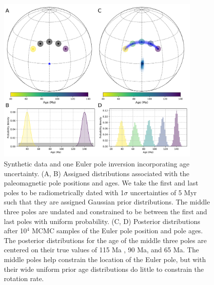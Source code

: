 \documentclass[11pt,letterpaper]{article}
\begin{document}
\begin{figure}
\centering
\includegraphics[width=0.9\textwidth]{fig_inversion_with_age_uncertainties.png}
\caption{Synthetic data and one Euler pole inversion incorporating age uncertainty. (A, B) Assigned distributions associated with the paleomagnetic pole positions and ages. We take the first and last poles to be radiometrically dated with 1$\sigma$ uncertainties of 5 Myr such that they are assigned Gaussian prior distributions. The middle three poles are undated and constrained to be between the first and last poles with uniform probability. (C, D) Posterior distributions after 10$^4$ MCMC samples of the Euler pole position and pole ages. The posterior distributions for the age of the middle three poles are centered on their true values of 115 Ma , 90 Ma, and 65 Ma. The middle poles help constrain the location of the Euler pole, but with their wide uniform prior age distributions do little to constrain the rotation rate.}
\label{fig:age_uncertainty_samples}
\end{figure}
\end{document}
